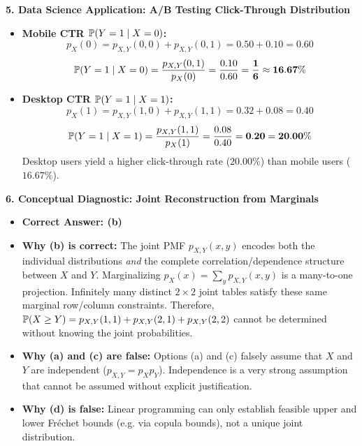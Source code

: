 \textbf{5. Data Science Application: A/B Testing Click-Through Distribution}
\begin{itemize}
    \item \textbf{Mobile CTR $\P(Y=1 \mid X=0)$:}
    $$p_X(0) = p_{X,Y}(0, 0) + p_{X,Y}(0, 1) = 0.50 + 0.10 = 0.60$$
    $$\P(Y=1 \mid X=0) = \frac{p_{X,Y}(0, 1)}{p_X(0)} = \frac{0.10}{0.60} = \mathbf{\frac{1}{6} \approx 16.67\%}$$
    \item \textbf{Desktop CTR $\P(Y=1 \mid X=1)$:}
    $$p_X(1) = p_{X,Y}(1, 0) + p_{X,Y}(1, 1) = 0.32 + 0.08 = 0.40$$
    $$\P(Y=1 \mid X=1) = \frac{p_{X,Y}(1, 1)}{p_X(1)} = \frac{0.08}{0.40} = \mathbf{0.20 = 20.00\%}$$
    Desktop users yield a higher click-through rate ($20.00\%$) than mobile users ($16.67\%$).
\end{itemize}

\textbf{6. Conceptual Diagnostic: Joint Reconstruction from Marginals}
\begin{itemize}
    \item \textbf{Correct Answer: (b)}
    \item \textbf{Why (b) is correct:} The joint PMF $p_{X,Y}(x, y)$ encodes both the individual distributions \emph{and} the complete correlation/dependence structure between $X$ and $Y$. Marginalizing $p_X(x) = \sum_y p_{X,Y}(x, y)$ is a many-to-one projection. Infinitely many distinct $2 \times 2$ joint tables satisfy these same marginal row/column constraints. Therefore, $\P(X \ge Y) = p_{X,Y}(1,1) + p_{X,Y}(2,1) + p_{X,Y}(2,2)$ cannot be determined without knowing the joint probabilities.
    \item \textbf{Why (a) and (c) are false:} Options (a) and (c) falsely assume that $X$ and $Y$ are independent ($p_{X,Y} = p_X p_Y$). Independence is a very strong assumption that cannot be assumed without explicit justification.
    \item \textbf{Why (d) is false:} Linear programming can only establish feasible upper and lower Fréchet bounds (e.g. via copula bounds), not a unique joint distribution.
\end{itemize}

